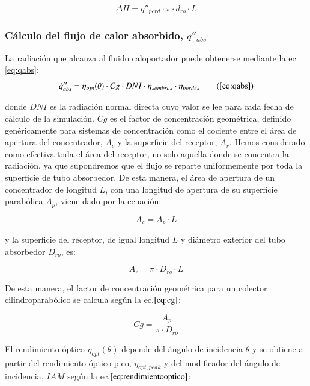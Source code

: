 \begin{equation}
   \Delta H =  \dot q''_{perd} \cdot \pi \cdot d_{ro} \cdot L
    \label{eq:delta_hvalornegativo}
\end{equation}

\subsubsection{Cálculo del flujo de calor absorbido, $\dot q''_{abs}$}

La radiación que alcanza al fluido caloportador puede obtenerse mediante la ec.\ref{eq:qabs}:
\begin{equation}
\notag \dot q''_{abs}= \eta_{opt}(\theta) \cdot Cg \cdot DNI \cdot \eta_{sombras} \cdot \eta_{bordes}  \tag{\ref{eq:qabs}}
\end{equation}

donde \(DNI\) es la radiación normal directa cuyo valor se lee para cada  fecha de cálculo de la simulación. \(Cg\) es el factor de concentración geométrica, definido genéricamente   para sistemas de concentración como el cociente entre el área de  apertura del concentrador, \(A_c\) y la superficie del receptor,   \(A_r\). Hemos considerado como efectiva toda el área del receptor, no solo aquella donde se concentra la radiación, ya que supondremos que el flujo se reparte uniformemente por toda la superficie de tubo absorbedor. De esta manera, el área de apertura de un concentrador de longitud $L$, con una longitud de apertura de su superficie parabólica $A_p$, viene dado por la ecuación:

\begin{equation}
   A_c = A_p \cdot L
    \label{eq:aperturaconcentrador}
\end{equation}

y la superficie del receptor, de igual longitud $L$ y diámetro exterior del tubo absorbedor $D_{ro}$, es:

\begin{equation}
   A_r = \pi \cdot D_{ro} \cdot L
    \label{eq:superficiereceptor}
\end{equation}

De esta manera,  el factor de concentración geométrica para un colector cilindroparabólico se calcula según la ec.\(\eqref{eq:cg}\):

\begin{equation}
   Cg = \frac{A_p}{\pi \cdot D_{ro}}
    \label{eq:cg}
\end{equation}


El rendimiento óptico \(\eta_{opt}(\theta)\)  depende del   ángulo de incidencia \(\theta\) y se obtiene a partir del rendimiento  óptico pico, \(\eta_{opt,peak}\) y del modificador del ángulo de   incidencia, \(IAM\) según la ec.\(\eqref{eq:rendimientooptico}\):


